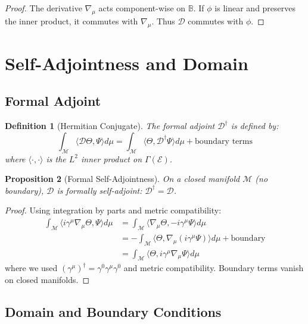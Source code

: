 \documentclass[12pt]{article}
\newtheorem{definition}{Definition}[section]
\newtheorem{proposition}[definition]{Proposition}
\newcommand{\B}{\mathbb{B}}
\newcommand{\M}{\mathcal{M}}
\begin{document}
\begin{proof}
The derivative $\nabla_\mu$ acts component-wise on $\B$. If $\phi$ is linear and preserves the inner product, it commutes with $\nabla_\mu$. Thus $\mathcal{D}$ commutes with $\phi$.
\end{proof}

\section{Self-Adjointness and Domain}

\subsection{Formal Adjoint}

\begin{definition}[Hermitian Conjugate]
The formal adjoint $\mathcal{D}^\dagger$ is defined by:
\begin{equation}
\int_\M \langle \mathcal{D} \Theta, \Psi \rangle d\mu = \int_\M \langle \Theta, \mathcal{D}^\dagger \Psi \rangle d\mu + \text{boundary terms}
\end{equation}
where $\langle \cdot, \cdot \rangle$ is the $L^2$ inner product on $\Gamma(\mathcal{E})$.
\end{definition}

\begin{proposition}[Formal Self-Adjointness]
\label{prop:formal_self_adjoint}
On a closed manifold $\M$ (no boundary), $\mathcal{D}$ is formally self-adjoint: $\mathcal{D}^\dagger = \mathcal{D}$.
\end{proposition}

\begin{proof}
Using integration by parts and metric compatibility:
\begin{align}
\int_\M \langle i\gamma^\mu \nabla_\mu \Theta, \Psi \rangle d\mu 
&= \int_\M \langle \nabla_\mu \Theta, -i\gamma^\mu \Psi \rangle d\mu \\
&= -\int_\M \langle \Theta, \nabla_\mu (i\gamma^\mu \Psi) \rangle d\mu + \text{boundary} \\
&= \int_\M \langle \Theta, i\gamma^\mu \nabla_\mu \Psi \rangle d\mu
\end{align}
where we used $(\gamma^\mu)^\dagger = \gamma^0 \gamma^\mu \gamma^0$ and metric compatibility. Boundary terms vanish on closed manifolds.
\end{proof}

\subsection{Domain and Boundary Conditions}
\end{document}
